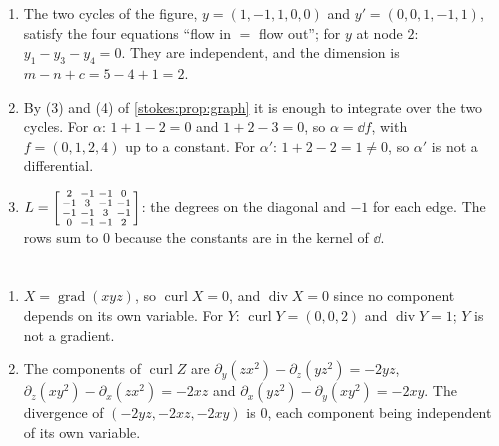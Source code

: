 \begin{enumerate}[nosep]
  \item The two cycles of the figure, $y = (1, -1, 1, 0, 0)$ and
        $y' = (0, 0, 1, -1, 1)$, satisfy the four equations
        ``flow in $=$ flow out''; for $y$ at node $2$: $y_1 - y_3 - y_4
        = 0$. They are independent, and the dimension is
        $m - n + c = 5 - 4 + 1 = 2$.
  \item By (3) and (4) of \cref{stokes:prop:graph} it is enough to
        integrate over the two cycles. For $\alpha$:
        $1 + 1 - 2 = 0$ and $1 + 2 - 3 = 0$, so $\alpha = \dd f$, with
        $f = (0, 1, 2, 4)$ up to a constant. For $\alpha'$:
        $1 + 2 - 2 = 1\neq0$, so $\alpha'$ is not a differential.
  \item $L = \begin{bsmallmatrix}2 & -1 & -1 & 0\\ -1 & 3 & -1 & -1\\
        -1 & -1 & 3 & -1\\ 0 & -1 & -1 & 2\end{bsmallmatrix}$: the
        degrees on the diagonal and $-1$ for each edge. The rows sum to
        $0$ because the constants are in the kernel of $\dd$.
\end{enumerate}

\section{}

\begin{enumerate}[nosep]
  \item $X = \operatorname{grad}(xyz)$, so
        $\operatorname{curl}X = 0$, and
        $\operatorname{div}X = 0$ since no component depends on its
        own variable. For $Y$:
        $\operatorname{curl}Y = (0, 0, 2)$ and
        $\operatorname{div}Y = 1$; $Y$ is not a gradient.
  \item The components of $\operatorname{curl}Z$ are
        $\partial_y(zx^2) - \partial_z(yz^2) = -2yz$,
        $\partial_z(xy^2) - \partial_x(zx^2) = -2xz$ and
        $\partial_x(yz^2) - \partial_y(xy^2) = -2xy$. The divergence
        of $(-2yz, -2xz, -2xy)$ is $0$, each component being
        independent of its own variable.
\end{enumerate}

